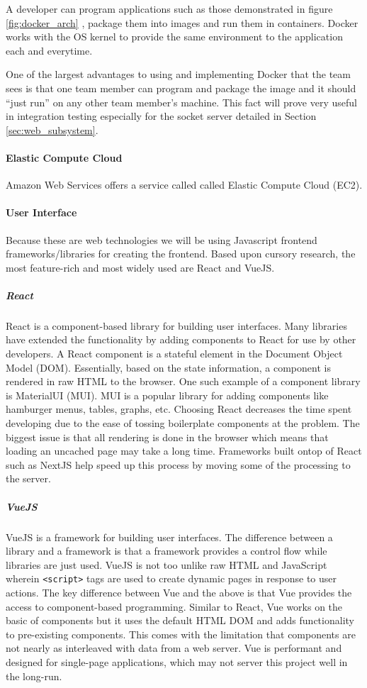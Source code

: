 A developer can program applications such as those demonstrated in figure \ref{fig:docker_arch} \cite{docker-what-container}, package them into images and run them in containers. Docker works with the OS kernel to provide the same environment to the application each and everytime.

One of the largest advantages to using and implementing Docker that the team sees is that one team member can program and package the image and it should ``just run'' on any other team member's machine. This fact will prove very useful in integration testing especially for the socket server detailed in Section \ref{sec:web_subsystem}.
\paragraph{Elastic Compute Cloud}
Amazon Web Services offers a service called called Elastic Compute Cloud (EC2).
\paragraph{User Interface}
Because these are web technologies we will be using Javascript frontend frameworks/libraries for creating the frontend. Based upon cursory research, the most feature-rich and most widely used are React and VueJS.
\subparagraph{React}
React is a component-based library for building user interfaces.  Many libraries have extended the functionality by adding components to React for use by other developers. A React component is a stateful element in the Document Object Model (DOM). Essentially, based on the state information, a component is rendered in raw HTML to the browser. One such example of a component library is MaterialUI (MUI). MUI is a popular library for adding components like hamburger menus, tables, graphs, etc. Choosing React decreases the time spent developing due to the ease of tossing boilerplate components at the problem. The biggest issue is that all rendering is done in the browser which means that loading an uncached page may take a long time. Frameworks built ontop of React such as NextJS help speed up this process by moving some of the processing to the server.
\subparagraph{VueJS}
VueJS is a framework for building user interfaces. The difference between a library and a framework is that a framework provides a control flow while libraries are just used. VueJS is not too unlike raw HTML and JavaScript wherein \verb|<script>| tags are used to create dynamic pages in response to user actions. The key difference between Vue and the above is that Vue provides the access to component-based programming. Similar to React, Vue works on the basic of components but it uses the default HTML DOM and adds functionality to pre-existing components. This comes with the limitation that components are not nearly as interleaved with data from a web server. Vue is performant and designed for single-page applications, which may not server this project well in the long-run.
